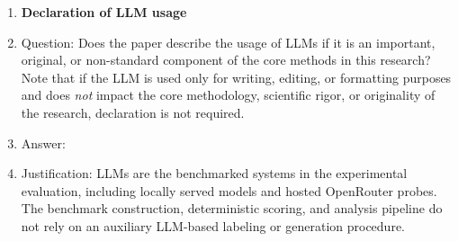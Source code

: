 \begin{enumerate}
\item {\bf Declaration of LLM usage}
    \item[] Question: Does the paper describe the usage of LLMs if it is an important, original, or non-standard component of the core methods in this research? Note that if the LLM is used only for writing, editing, or formatting purposes and does \emph{not} impact the core methodology, scientific rigor, or originality of the research, declaration is not required.
    \item[] Answer: \answerYes{}
    \item[] Justification: LLMs are the benchmarked systems in the experimental evaluation, including locally served models and hosted OpenRouter probes. The benchmark construction, deterministic scoring, and analysis pipeline do not rely on an auxiliary LLM-based labeling or generation procedure.

\end{enumerate}
